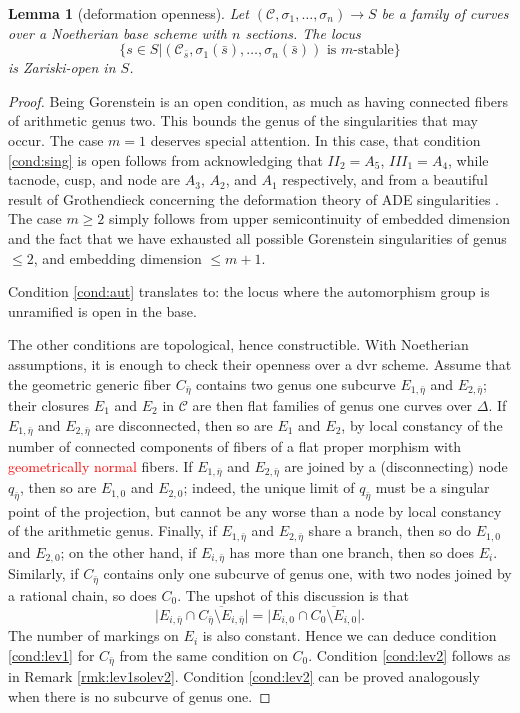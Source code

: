 \documentclass[11pt]{amsart}
\renewcommand{\to}{\rightarrow}
\newcommand{\dvr}{\Delta}
\theoremstyle{plain}
\newtheorem{lem}[thm]{Lemma}
\theoremstyle{definition}
\begin{document}
\begin{lem}[deformation openness]
 Let $(\mathcal C,\sigma_1,\ldots,\sigma_n)\to S$ be a family of curves over a Noetherian base scheme with $n$ sections. The locus \[\{s\in S|(\mathcal C_{\bar s},\sigma_1(\bar s),\ldots,\sigma_n(\bar s)) \text{ is } m\text{-stable}\}\] is Zariski-open in $S$.
\end{lem}
\begin{proof}
 Being Gorenstein is an open condition, as much as having connected fibers of arithmetic genus two. This bounds the genus of the singularities that may occur. The case $m=1$ deserves special attention. In this case, that condition \eqref{cond:sing} is open follows from acknowledging that $I\!I_2=A_5$, $I\!I\!I_1=A_4$, while tacnode, cusp, and node are $A_3$, $A_2$, and $A_1$ respectively, and from a beautiful result of Grothendieck concerning the deformation theory of ADE singularities \cite{Arnold,Demazure}. The case $m\geq 2$ simply follows from upper semicontinuity of embedded dimension and the fact that we have exhausted all possible Gorenstein singularities of genus $\leq 2$, and embedding dimension $\leq m+1$.
 
 Condition \eqref{cond:aut} translates to: the locus where the automorphism group is unramified is open in the base.
 
 The other conditions are topological, hence constructible. With Noetherian assumptions, it is enough to check their openness over a dvr scheme. Assume that the geometric generic fiber $C_{\bar\eta}$ contains two genus one subcurve $E_{1,\bar\eta}$ and $E_{2,\bar\eta}$; their closures $E_1$ and $E_2$ in $\mathcal C$ are then flat families of genus one curves over $\dvr$. If $E_{1,\bar\eta}$ and $E_{2,\bar\eta}$ are disconnected, then so are $E_1$ and $E_2$, by local constancy of the number of connected components of fibers of a flat proper morphism with \textcolor{red}{geometrically normal} fibers. If $E_{1,\bar\eta}$ and $E_{2,\bar\eta}$ are joined by a (disconnecting) node $q_{\bar\eta}$, then so are $E_{1,0}$ and $E_{2,0}$; indeed, the unique limit of $q_{\bar\eta}$ must be a singular point of the projection, but cannot be any worse than a node by local constancy of the arithmetic genus. Finally, if $E_{1,\bar\eta}$ and $E_{2,\bar\eta}$ share a branch, then so do $E_{1,0}$ and $E_{2,0}$; on the other hand, if $E_{i,\bar\eta}$ has more than one branch, then so does $E_i$. Similarly, if $C_{\bar\eta}$ contains only one subcurve of genus one, with two nodes joined by a rational chain, so does $C_0$. The upshot of this discussion is that
 \[\lvert E_{i,\bar\eta}\cap\overline{C_{\bar\eta}\setminus E_{i,\bar\eta}}\rvert=\lvert E_{i,0}\cap\overline{C_{0}\setminus E_{i,0}}\rvert.\]
 The number of markings on $E_i$ is also constant. Hence we can deduce condition \eqref{cond:lev1} for $C_{\bar\eta}$ from the same condition on $C_0$. Condition \eqref{cond:lev2} follows as in Remark \ref{rmk:lev1solev2}. Condition \eqref{cond:lev2} can be proved analogously when there is no subcurve of genus one.
 

\end{proof}
\end{document}
